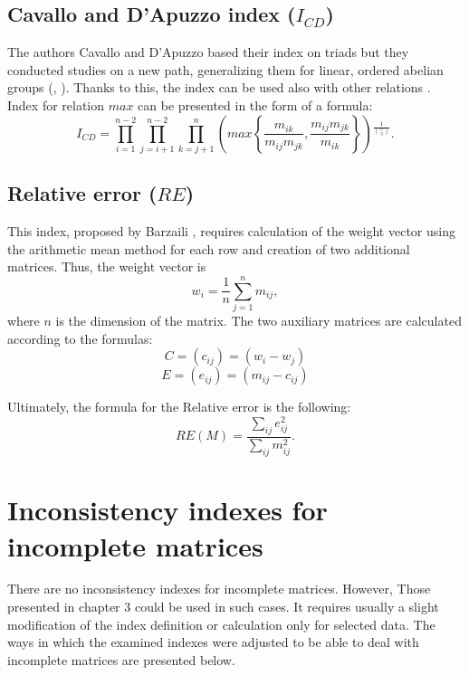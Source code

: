 \subsection{Cavallo and D’Apuzzo index ($I_{CD}$)}

The authors Cavallo and D'Apuzzo based their index on triads but they conducted studies on a new path, generalizing them for linear, ordered abelian groups (\cite{Cavallo2009}, \cite{Cavallo2010}). Thanks to this, the index can be used also with other relations \cite{Brunelli2013}. Index for relation $max$ can be presented in the form of a formula:
	\begin{equation} 
		\label{eq:CavDAp}
		I_{CD}=\prod_{i=1}^{n-2}\prod_{j=i+1}^{n-2}\prod_{k=j+1}^{n}\left(max\left\{ \frac{m_{ik}}{m_{ij}m_{jk}},\frac{m_{ij}m_{jk}}{m_{ik}}\right\} \right){}^{\frac{1}{\binom{n}{3}}}.
	 \end{equation}
 

\subsection{Relative error ($\textit{RE}$)}

This index, proposed by Barzaili \cite{Jonathan1998}, requires calculation of the weight vector using the arithmetic mean method for each row and creation of two additional matrices. Thus, the weight vector is $$w_{i}=\frac{1}{n}\sum_{j=1}^{n}m_{ij},$$ where $n$ is the dimension of the matrix. The two auxiliary matrices are calculated according to the formulas:
$$C=\left(c_{ij}\right)=\left(w_{i}-w_{j}\right)$$
$$E=\left(e_{ij}\right)=\left(m_{ij}-c_{ij}\right)$$

Ultimately, the formula for the Relative error is the following:
	\begin{equation} 
		RE(M)=\frac{\sum_{ij}e_{ij}^{2}}{\sum_{ij}m_{ij}^{2}}.
	 \end{equation}


\section{Inconsistency indexes for incomplete matrices}
\label{sec:inconsistencyIndexesForIncompleteMatrices}

There are no inconsistency indexes for incomplete matrices. However, Those presented in chapter 3 could be used in such cases. It requires usually a slight modification of the index definition or calculation only for selected data. The ways in which the examined indexes were adjusted to be able to deal with incomplete matrices are presented below.

